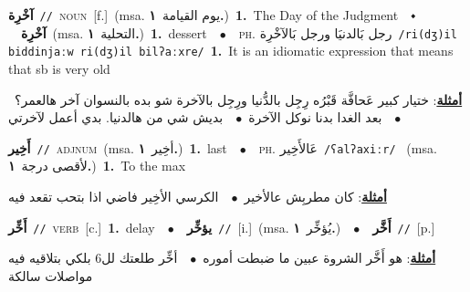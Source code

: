 \documentclass[10pt,a4paper,twoside]{article} %
\begin{document}
\begin{multicols}{2}
{{{{{{{{\setlength\topsep{0pt}\textbf{\foreignlanguage{arabic}{آخْرِة}}\ {\color{gray}\texttt{//}\color{black}}\ \textsc{noun}\ [f.]\ \color{gray}(msa. \foreignlanguage{arabic}{يوم القيامة}~\foreignlanguage{arabic}{\textbf{١.}})\color{black}\ \textbf{1.}~The Day of the Judgment\ \ $\smblkdiamond$\ \ \setlength\topsep{0pt}\textbf{\foreignlanguage{arabic}{آخْرِة}}\ \color{gray}(msa. \foreignlanguage{arabic}{التحلية}~\foreignlanguage{arabic}{\textbf{١.}})\color{black}\ \textbf{1.}~dessert\ \ $\bullet$\ \ \textsc{ph.} \color{gray} \foreignlanguage{arabic}{رجل بَالدنيَا ورجل بَالآخْرِة}\color{black}\ {\color{gray}\texttt{/{\sffamily ri(dʒ)il biddinjaːw ri(dʒ)il bilʔaːxre}/}\color{black}}\ \textbf{1.}~It is an idiomatic expression that means that sb is very old\  \begin{flushright}\color{gray}\foreignlanguage{arabic}{\textbf{\underline{\foreignlanguage{arabic}{أمثلة}}}: ختيار كبير عَحافَّة قَبْرُه رِجِل بالدُّنيا ورِجِل بالآخرة شو بده بالنسوان آخر هالعمر؟\ $\bullet$\ \  بعد الغدا بدنا نوكل الآخرة\ $\bullet$\ \  بديش شي من هالدنيا. بدي أعمل لآخرتي}\end{flushright}\color{black}} \vspace{2mm}

{\setlength\topsep{0pt}\textbf{\foreignlanguage{arabic}{أَخِير}}\ {\color{gray}\texttt{//}\color{black}}\ \textsc{adj\textunderscore num}\ \color{gray}(msa. \foreignlanguage{arabic}{أخِير}~\foreignlanguage{arabic}{\textbf{١.}})\color{black}\ \textbf{1.}~last\ \ $\bullet$\ \ \textsc{ph.} \color{gray} \foreignlanguage{arabic}{عَالأَخِير}\color{black}\ {\color{gray}\texttt{/{\sffamily ʕalʔaxiːr}/}\color{black}}\ \color{gray} (msa. \foreignlanguage{arabic}{لأقصى درجة}~\foreignlanguage{arabic}{\textbf{١.}})\color{black}\ \textbf{1.}~To the max\  \begin{flushright}\color{gray}\foreignlanguage{arabic}{\textbf{\underline{\foreignlanguage{arabic}{أمثلة}}}: كان مطربِش عالأخير\ $\bullet$\ \  الكرسي الأخِير فاضي اذا بتحب تقعد فيه}\end{flushright}\color{black}} \vspace{2mm}

{\setlength\topsep{0pt}\textbf{\foreignlanguage{arabic}{أَخِّر}}\ {\color{gray}\texttt{//}\color{black}}\ \textsc{verb}\ [c.]\ \textbf{1.}~delay\ \ $\bullet$\ \ \setlength\topsep{0pt}\textbf{\foreignlanguage{arabic}{يؤخِّر}}\ {\color{gray}\texttt{//}\color{black}}\ [i.]\ \color{gray}(msa. \foreignlanguage{arabic}{يُؤخِّر}~\foreignlanguage{arabic}{\textbf{١.}})\color{black}\ \ $\bullet$\ \ \setlength\topsep{0pt}\textbf{\foreignlanguage{arabic}{أَخَّر}}\ {\color{gray}\texttt{//}\color{black}}\ [p.]\  \begin{flushright}\color{gray}\foreignlanguage{arabic}{\textbf{\underline{\foreignlanguage{arabic}{أمثلة}}}: هو أَخَّر الشروة عبين ما ضبطت أموره\ $\bullet$\ \  أخِّر طلعتك لل6 بلكي بتلاقيه فيه مواصلات سالكة}\end{flushright}\color{black}} \vspace{2mm}

}}}}}}}
\end{multicols}
\end{document}
